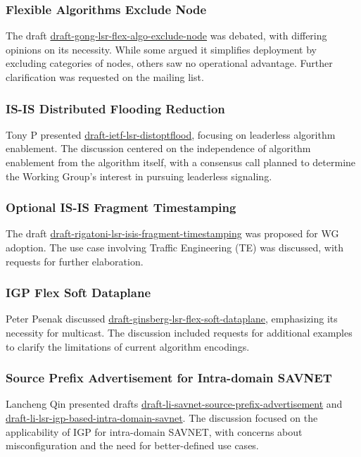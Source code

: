 \documentclass{article}
\begin{document}
\subsubsection{Flexible Algorithms Exclude Node}
The draft \href{https://datatracker.ietf.org/doc/html/draft-gong-lsr-flex-algo-exclude-node}{draft-gong-lsr-flex-algo-exclude-node} was debated, with differing opinions on its necessity. While some argued it simplifies deployment by excluding categories of nodes, others saw no operational advantage. Further clarification was requested on the mailing list.

\subsubsection{IS-IS Distributed Flooding Reduction}
Tony P presented \href{https://datatracker.ietf.org/doc/html/draft-ietf-lsr-distoptflood}{draft-ietf-lsr-distoptflood}, focusing on leaderless algorithm enablement. The discussion centered on the independence of algorithm enablement from the algorithm itself, with a consensus call planned to determine the Working Group's interest in pursuing leaderless signaling.

\subsubsection{Optional IS-IS Fragment Timestamping}
The draft \href{https://datatracker.ietf.org/doc/html/draft-rigatoni-lsr-isis-fragment-timestamping}{draft-rigatoni-lsr-isis-fragment-timestamping} was proposed for WG adoption. The use case involving Traffic Engineering (TE) was discussed, with requests for further elaboration.

\subsubsection{IGP Flex Soft Dataplane}
Peter Psenak discussed \href{https://datatracker.ietf.org/doc/html/draft-ginsberg-lsr-flex-soft-dataplane}{draft-ginsberg-lsr-flex-soft-dataplane}, emphasizing its necessity for multicast. The discussion included requests for additional examples to clarify the limitations of current algorithm encodings.

\subsubsection{Source Prefix Advertisement for Intra-domain SAVNET}
Lancheng Qin presented drafts \href{https://datatracker.ietf.org/doc/html/draft-li-savnet-source-prefix-advertisement}{draft-li-savnet-source-prefix-advertisement} and \href{https://datatracker.ietf.org/doc/html/draft-li-lsr-igp-based-intra-domain-savnet}{draft-li-lsr-igp-based-intra-domain-savnet}. The discussion focused on the applicability of IGP for intra-domain SAVNET, with concerns about misconfiguration and the need for better-defined use cases.
\end{document}
